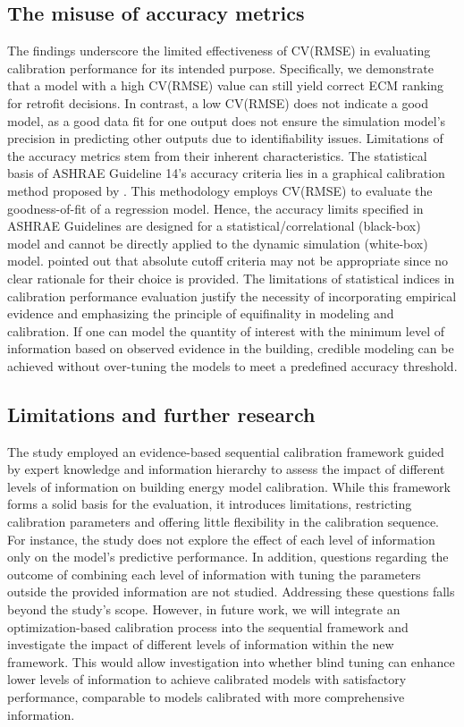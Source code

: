 \documentclass[3p,times,12pt]{elsarticle}
\begin{document}
\begin{sloppypar}
\subsection{The misuse of accuracy metrics}
\label{S:4.3}
The findings underscore the limited effectiveness of CV(RMSE) in evaluating calibration performance for its intended purpose. Specifically, we demonstrate that a model with a high CV(RMSE) value can still yield correct ECM ranking for retrofit decisions. In contrast, a low CV(RMSE) does not indicate a good model, as a good data fit for one output does not ensure the simulation model's precision in predicting other outputs due to identifiability issues. Limitations of the accuracy metrics stem from their inherent characteristics. The statistical basis of ASHRAE Guideline 14's accuracy criteria lies in a graphical calibration method proposed by \citet{reddy1997baselining}. This methodology employs CV(RMSE) to evaluate the goodness-of-fit of a regression model. Hence, the accuracy limits specified in ASHRAE Guidelines are designed for a statistical/correlational (black-box) model and cannot be directly applied to the dynamic simulation (white-box) model. \citet{reddy2000uncertainty} pointed out that absolute cutoff criteria may not be appropriate since no clear rationale for their choice is provided. The limitations of statistical indices in calibration performance evaluation justify the necessity of incorporating empirical evidence \cite{homer2014levels} and emphasizing the principle of equifinality \cite{beven2001equifinality} in modeling and calibration. If one can model the quantity of interest with the minimum level of information based on observed evidence in the building, credible modeling can be achieved without over-tuning the models to meet a predefined accuracy threshold.

\subsection{Limitations and further research}
\label{S:4.4}
The study employed an evidence-based sequential calibration framework guided by expert knowledge and information hierarchy to assess the impact of different levels of information on building energy model calibration. While this framework forms a solid basis for the evaluation, it introduces limitations, restricting calibration parameters and offering little flexibility in the calibration sequence. For instance, the study does not explore the effect of each level of information only on the model's predictive performance. In addition, questions regarding the outcome of combining each level of information with tuning the parameters outside the provided information are not studied. Addressing these questions falls beyond the study's scope. However, in future work, we will integrate an optimization-based calibration process into the sequential framework and investigate the impact of different levels of information within the new framework. This would allow investigation into whether blind tuning can enhance lower levels of information to achieve calibrated models with satisfactory performance, comparable to models calibrated with more comprehensive information.


\end{sloppypar}
\end{document}
